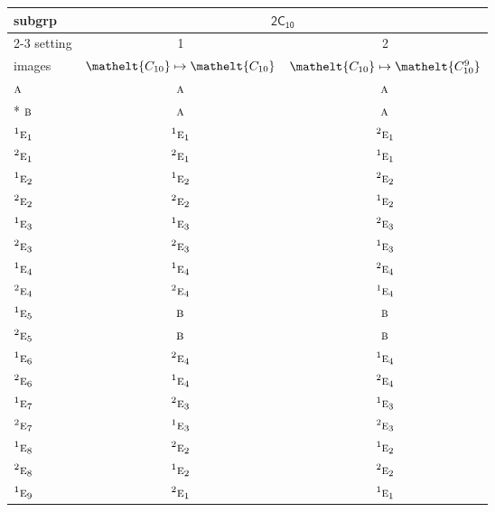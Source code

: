 \documentclass[10pt,a4paper]{article}
\numberwithin{equation}{section}
\newcommand{\eltfont}[1]{{\let\sigma\eltsigma\mathelt{#1}}}
\newcommand{\grp}[1]{\mathsf{#1}}
\newcommand{\irr}[1]{\text{\normalfont\scshape #1}}
\newcommand{\conjpair}[1]{{}^{#1}}
\newcommand{\cls}[1]{\eltfont{#1}}
\begin{document}
{\small\begin{longtable}{@{}lcc@{}}\toprule
subgrp & \multicolumn{2}{c}{\href{2C10.pdf}{$\grp{2C_{10}}$}}\\\cmidrule(lr){2-3}
setting & 1 & 2\\
images & {\scriptsize $\cls{C_{10}} \mapsto \cls{C_{10}}$} & {\scriptsize $\cls{C_{10}} \mapsto \cls{C_{10}^{9}}$}\\\midrule\endhead
\bottomrule\endfoot\endlastfoot
$\irr{a}$ & $\irr{a}$ & $\irr{a}$\\*
$\irr{b}$ & $\irr{a}$ & $\irr{a}$\\
$\conjpair{1}\irr{e}_{1}$ & $\conjpair{1}\irr{e}_{1}$ & $\conjpair{2}\irr{e}_{1}$\\
$\conjpair{2}\irr{e}_{1}$ & $\conjpair{2}\irr{e}_{1}$ & $\conjpair{1}\irr{e}_{1}$\\
$\conjpair{1}\irr{e}_{2}$ & $\conjpair{1}\irr{e}_{2}$ & $\conjpair{2}\irr{e}_{2}$\\
$\conjpair{2}\irr{e}_{2}$ & $\conjpair{2}\irr{e}_{2}$ & $\conjpair{1}\irr{e}_{2}$\\
$\conjpair{1}\irr{e}_{3}$ & $\conjpair{1}\irr{e}_{3}$ & $\conjpair{2}\irr{e}_{3}$\\
$\conjpair{2}\irr{e}_{3}$ & $\conjpair{2}\irr{e}_{3}$ & $\conjpair{1}\irr{e}_{3}$\\
$\conjpair{1}\irr{e}_{4}$ & $\conjpair{1}\irr{e}_{4}$ & $\conjpair{2}\irr{e}_{4}$\\
$\conjpair{2}\irr{e}_{4}$ & $\conjpair{2}\irr{e}_{4}$ & $\conjpair{1}\irr{e}_{4}$\\
$\conjpair{1}\irr{e}_{5}$ & $\irr{b}$ & $\irr{b}$\\
$\conjpair{2}\irr{e}_{5}$ & $\irr{b}$ & $\irr{b}$\\
$\conjpair{1}\irr{e}_{6}$ & $\conjpair{2}\irr{e}_{4}$ & $\conjpair{1}\irr{e}_{4}$\\
$\conjpair{2}\irr{e}_{6}$ & $\conjpair{1}\irr{e}_{4}$ & $\conjpair{2}\irr{e}_{4}$\\
$\conjpair{1}\irr{e}_{7}$ & $\conjpair{2}\irr{e}_{3}$ & $\conjpair{1}\irr{e}_{3}$\\
$\conjpair{2}\irr{e}_{7}$ & $\conjpair{1}\irr{e}_{3}$ & $\conjpair{2}\irr{e}_{3}$\\
$\conjpair{1}\irr{e}_{8}$ & $\conjpair{2}\irr{e}_{2}$ & $\conjpair{1}\irr{e}_{2}$\\
$\conjpair{2}\irr{e}_{8}$ & $\conjpair{1}\irr{e}_{2}$ & $\conjpair{2}\irr{e}_{2}$\\
$\conjpair{1}\irr{e}_{9}$ & $\conjpair{2}\irr{e}_{1}$ & $\conjpair{1}\irr{e}_{1}$\\

\end{longtable}}
\end{document}
